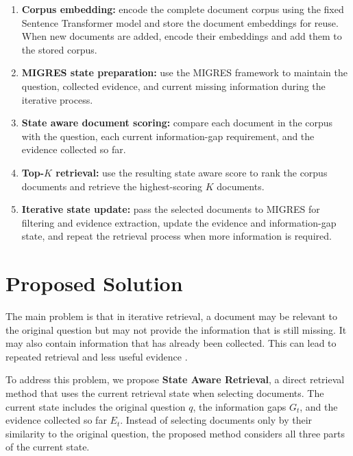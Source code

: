 \documentclass[12pt,a4paper]{report}
\begin{document}
\begin{enumerate}[leftmargin=0.30in,itemsep=0.14in,parsep=0pt]
\item \textbf{Corpus embedding:} encode the complete document corpus using the fixed Sentence Transformer model and store the document embeddings for reuse. When new documents are added, encode their embeddings and add them to the stored corpus.

\item \textbf{MIGRES state preparation:} use the MIGRES framework to maintain the question, collected evidence, and current missing information during the iterative process.

\item \textbf{State aware document scoring:} compare each document in the corpus with the question, each current information-gap requirement, and the evidence collected so far.

\item \textbf{Top-$K$ retrieval:} use the resulting state aware score to rank the corpus documents and retrieve the highest-scoring $K$ documents.

\item \textbf{Iterative state update:} pass the selected documents to MIGRES for filtering and evidence extraction, update the evidence and information-gap state, and repeat the retrieval process when more information is required.
\end{enumerate}

\clearpage

\section{Proposed Solution}

The main problem is that in iterative retrieval, a document may be relevant to the original question but may not provide the information that is still missing. It may also contain information that has already been collected. This can lead to repeated retrieval and less useful evidence \cite{yadav2020iterative,pickett2024better,wang2025infogain}.

To address this problem, we propose \textbf{State Aware Retrieval}, a direct retrieval method that uses the current retrieval state when selecting documents. The current state includes the original question $q$, the information gaps $G_t$, and the evidence collected so far $E_t$. Instead of selecting documents only by their similarity to the original question, the proposed method considers all three parts of the current state.
\end{document}
